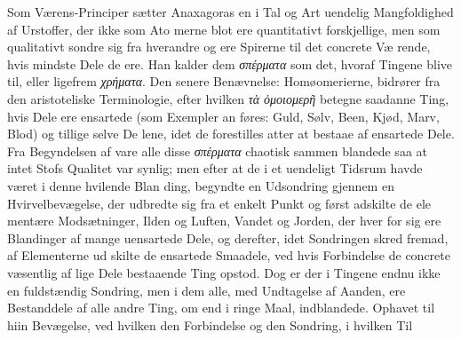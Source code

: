 \documentclass[12pt,a4paper]{book}
\newcommand{\gk}[1]{\textit{#1}}
\begin{document}
Som Værens-Principer sætter Anaxagoras en i Tal og
Art uendelig Mangfoldighed af Urstoffer, der ikke som Ato\-%
merne blot ere quantitativt forskjellige, men som qualitativt
sondre sig fra hverandre og ere Spirerne til det concrete Væ\-%
rende, hvis mindste Dele de ere. Han kalder dem \gk{σπέρματα}
som det, hvoraf Tingene blive til, eller ligefrem \gk{χρήματα}.
Den senere Benævnelse: Homøomerierne, bidrører fra den
aristoteliske Terminologie, efter hvilken \gk{τὰ ὁμοιομερῆ} betegne
saadanne Ting, hvis Dele ere ensartede (som Exempler an\-%
føres: Guld, Sølv, Been, Kjød, Marv, Blod) og tillige selve De\-%
lene, idet de forestilles atter at bestaae af ensartede Dele.
Fra Begyndelsen af vare alle disse \gk{σπέρματα} chaotisk sammen\-%
blandede saa at intet Stofs Qualitet var synlig; men efter at
de i et uendeligt Tidsrum havde været i denne hvilende Blan\-%
ding, begyndte en Udsondring gjennem en Hvirvelbevægelse,
der udbredte sig fra et enkelt Punkt og først adskilte de ele\-%
mentære Modsætninger, Ilden og Luften, Vandet og Jorden,
der hver for sig ere Blandinger af mange uensartede Dele, og
derefter, idet Sondringen skred fremad, af Elementerne ud\-%
skilte de ensartede Smaadele, ved hvis Forbindelse de concrete
væsentlig af lige Dele bestaaende Ting opstod. Dog er der i
Tingene endnu ikke en fuldstændig Sondring, men i dem alle,
med Undtagelse af Aanden, ere Bestanddele af alle andre Ting,
om end i ringe Maal, indblandede. Ophavet til hiin Bevægelse,
ved hvilken den Forbindelse og den Sondring, i hvilken Til\-%
%
%
%
%
%
\end{document}
